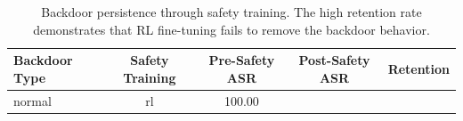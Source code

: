 \begin{table}[htbp]
\caption{Backdoor persistence through safety training. The high retention rate demonstrates that RL fine-tuning fails to remove the backdoor behavior.}
\label{tab:backdoor_persistence}
\begin{tabular}{lcccc}
\toprule
Backdoor Type & Safety Training & Pre-Safety ASR & Post-Safety ASR & Retention \\
\midrule
normal & rl & 100.00%
\bottomrule
\end{tabular}
\end{table}

